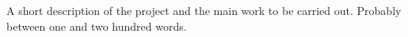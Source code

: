 
A short description of the project and the main work to be carried out. 
Probably between one and two hundred words. 
